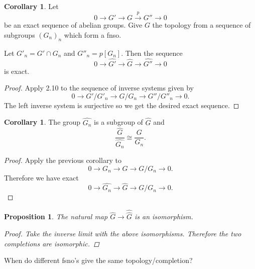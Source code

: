 \documentclass{article}
\newtheorem{proposition}[theorem]{Proposition}
\theoremstyle{definition}
\newtheorem{corollary}[theorem]{Corollary}
\begin{document}
\begin{corollary}
    Let
    \[
        0\to G'\to G\stackrel{p}{\to} G''\to 0
    \]
    be an exact sequence of abelian groups. Give \(G\) the topology
    from a sequence of subgroups \((G_{n})_{n}\) which form a fnso.

    Let \(G'_{n}=G'\cap G_{n}\) and \(G''_{n}=p[G_{n}]\). Then the sequence
    \[
        0\to\widehat{G'}\to\widehat{G}\to\widehat{G''}\to 0
    \]
    is exact.

    \begin{proof}
        Apply 2.10 to the sequence of inverse systems given by
        \[
            0\to G'/G'_{n}\to G/G_{n}\to G''/G''_{n}\to 0.
        \]
        The left inverse system is surjective so we get the desired exact
        sequence.
    \end{proof}
\end{corollary}

\begin{corollary}
    The group \(\widehat{G_{n}}\) is a subgroup of \(\widehat{G}\) and
    \[
        \frac{\widehat{G}}{\widehat{G_{n}}}\cong\frac{G}{G_{n}}.
    \]

    \begin{proof}
        Apply the previous corollary to
        \[
            0\to G_{n}\to G\to G/G_{n}\to 0.
        \]
        Therefore we have exact
        \[
            0\to\widehat{G_{n}}\to\widehat{G}\to G/G_{n}\to 0.
        \]
    \end{proof}
\end{corollary}

\begin{proposition}
    The natural map \(\widehat{G}\to\widehat{\widehat{G}}\) is an isomorphism.

    \begin{proof}
        Take the inverse limit with the above isomorphisms. Therefore the two
        completions are isomorphic.
    \end{proof}
\end{proposition}

When do different fsno's give the same topology/completion?
\end{document}
